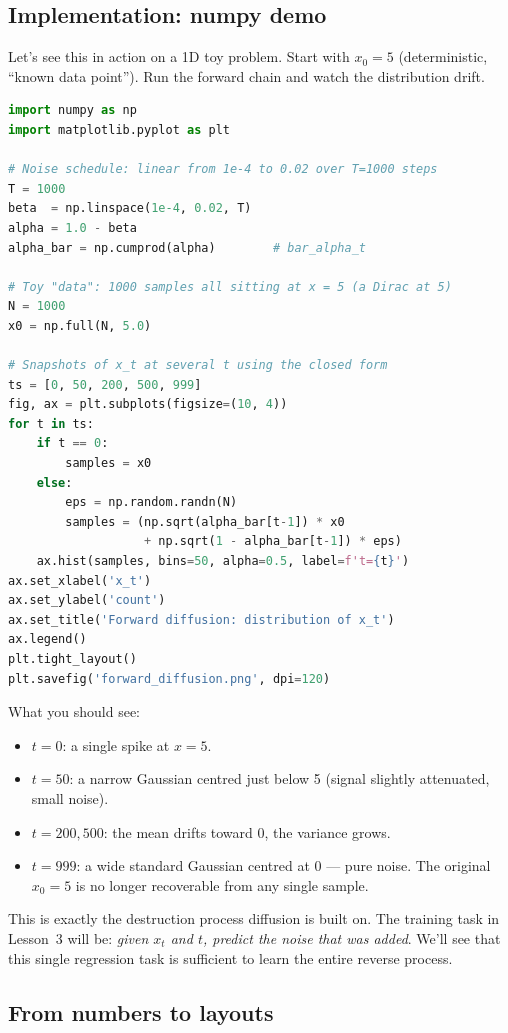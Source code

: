 \documentclass[11pt,a4paper]{article}
\begin{document}
\subsection{Implementation: numpy demo}

Let's see this in action on a 1D toy problem. Start with $x_0 = 5$
(deterministic, ``known data point''). Run the forward chain and watch
the distribution drift.

\begin{lstlisting}[language=Python]
import numpy as np
import matplotlib.pyplot as plt

# Noise schedule: linear from 1e-4 to 0.02 over T=1000 steps
T = 1000
beta  = np.linspace(1e-4, 0.02, T)
alpha = 1.0 - beta
alpha_bar = np.cumprod(alpha)        # bar_alpha_t

# Toy "data": 1000 samples all sitting at x = 5 (a Dirac at 5)
N = 1000
x0 = np.full(N, 5.0)

# Snapshots of x_t at several t using the closed form
ts = [0, 50, 200, 500, 999]
fig, ax = plt.subplots(figsize=(10, 4))
for t in ts:
    if t == 0:
        samples = x0
    else:
        eps = np.random.randn(N)
        samples = (np.sqrt(alpha_bar[t-1]) * x0
                   + np.sqrt(1 - alpha_bar[t-1]) * eps)
    ax.hist(samples, bins=50, alpha=0.5, label=f't={t}')
ax.set_xlabel('x_t')
ax.set_ylabel('count')
ax.set_title('Forward diffusion: distribution of x_t')
ax.legend()
plt.tight_layout()
plt.savefig('forward_diffusion.png', dpi=120)
\end{lstlisting}

What you should see:
\begin{itemize}[leftmargin=*]
\item $t=0$: a single spike at $x = 5$.
\item $t=50$: a narrow Gaussian centred just below 5 (signal slightly attenuated, small noise).
\item $t=200,500$: the mean drifts toward 0, the variance grows.
\item $t=999$: a wide standard Gaussian centred at 0 --- pure noise. The original $x_0=5$ is no longer recoverable from any single sample.
\end{itemize}
This is exactly the destruction process diffusion is built on. The
training task in Lesson~3 will be: \emph{given $x_t$ and $t$, predict
the noise that was added}. We'll see that this single regression task
is sufficient to learn the entire reverse process.

\subsection{From numbers to layouts}
\end{document}
